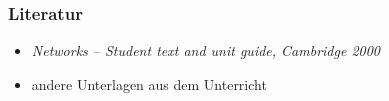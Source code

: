 \documentclass[a4paper,titlepage]{article}
\begin{document}
\subsubsection{Literatur}
\begin{itemize}
\item \emph{Networks -- Student text and unit guide, Cambridge 2000}
\item andere Unterlagen aus dem Unterricht
\end{itemize}
\end{document}
